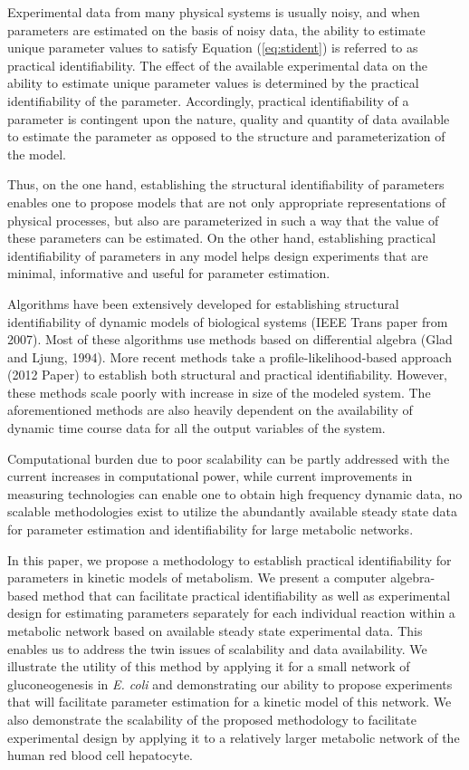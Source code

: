 \documentclass[10pt]{article}
\begin{document}
Experimental data from many physical systems is usually noisy, and when parameters are estimated on the basis of noisy data, the ability to estimate unique parameter values to satisfy Equation (\ref{eq:stident}) is referred to as practical identifiability. The effect of the available experimental data on the ability to estimate unique parameter values is determined by the practical identifiability of the parameter. Accordingly, practical identifiability of a parameter is contingent upon the nature, quality and quantity of data available to estimate the parameter as opposed to the structure and parameterization of the model. 

Thus, on the one hand, establishing the structural identifiability of parameters enables one to propose models that are not only appropriate representations of physical processes, but also are parameterized in such a way that the value of these parameters can be estimated. On the other hand, establishing practical identifiability of parameters in any model helps design experiments that are minimal, informative and useful for parameter estimation.

Algorithms have been extensively developed for establishing structural identifiability of dynamic models of biological systems (IEEE Trans paper from 2007). Most of these algorithms use methods based on differential algebra (Glad and Ljung, 1994). More recent methods take a profile-likelihood-based approach (2012 Paper) to establish both structural and practical identifiability. However, these methods scale poorly with increase in size of the modeled system. The aforementioned methods are also heavily dependent on the availability of dynamic time course data for all the output variables of the system. 

Computational burden due to poor scalability can be partly addressed with the current increases in computational power, while current improvements in measuring technologies can enable one to obtain high frequency dynamic data, no scalable methodologies exist to utilize the abundantly available steady state data for parameter estimation and identifiability for large metabolic networks. 

In this paper, we propose a methodology to establish practical identifiability for parameters in kinetic models of metabolism. We present a computer algebra-based method that can facilitate practical identifiability as well as experimental design for estimating parameters separately for each individual reaction within a metabolic network based on available steady state experimental data. This enables us to address the twin issues of scalability and data availability. We illustrate the utility of this method by applying it for a small network of gluconeogenesis in \textit{E. coli} and demonstrating our ability to propose experiments that will facilitate parameter estimation for a kinetic model of this network. We also demonstrate the scalability of the proposed methodology to facilitate experimental design by applying it to a relatively larger metabolic network of the human red blood cell hepatocyte. 	
\end{document}
